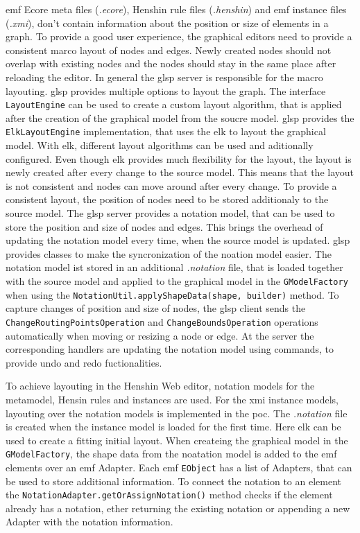 \documentclass[conference,onecolumn]{IEEEtran}
\newcommand{\code}[1]{\texttt{#1}}
\begin{document}
  \ac{emf} Ecore meta files (\textit{.ecore}), Henshin rule files (\textit{.henshin}) and \ac{emf} instance files (\textit{.xmi}), don't contain information about the position or size of elements in a graph. \cite{emf,henshin-repo} To provide a good user experience, the graphical editors need to provide a consistent marco layout of nodes and edges. Newly created nodes should not overlap with existing nodes and the nodes should stay in the same place after reloading the editor. In general the \ac{glsp} server is responsible for the macro layouting. \cite{glsp-doc} \ac{glsp} provides multiple options to layout the graph. The interface \code{LayoutEngine} can be used to create a custom layout algorithm, that is applied after the creation of the graphical model from the soucre model. \ac{glsp} provides the \code{ElkLayoutEngine} implementation, that uses the \ac{elk} to layout the graphical model. \cite{elk-engine} With \ac{elk}, different layout algorithms can be used and aditionally configured. Even though \ac{elk} provides much flexibility for the layout, the layout is newly created after every change to the source model. This means that the layout is not consistent and nodes can move around after every change. To provide a consistent layout, the position of nodes need to be stored additionaly to the source model. The \ac{glsp} server provides a notation model, that can be used to store the position and size of nodes and edges. \cite{glsp-repo} This brings the overhead of updating the notation model every time, when the source model is updated. \ac{glsp} provides classes to make the syncronization of the noation model easier. The notation model ist stored in an additional \textit{.notation} file, that is loaded together with the source model and applied to the graphical model in the \code{GModelFactory} when using the \code{NotationUtil.applyShapeData(shape, builder)} method. To capture changes of position and size of nodes, the \ac{glsp} client sends the \code{ChangeRoutingPointsOperation} and \code{ChangeBoundsOperation} operations automatically when moving or resizing a node or edge. At the server the corresponding handlers are updating the notation model using commands, to provide undo and redo fuctionalities.

  To achieve layouting in the Henshin Web editor, notation models for the metamodel, Hensin rules and instances are used. For the \ac{xmi} instance models, layouting over the notation models is implemented in the \acs{poc}. The \textit{.notation} file is created when the instance model is loaded for the first time. Here \ac{elk} can be used to create a fitting initial layout. When createing the graphical model in the \code{GModelFactory}, the shape data from the noatation model is added to the \ac{emf} elements over an \ac{emf} Adapter. Each \ac{emf} \code{EObject} has a list of Adapters, that can be used to store additional information. \cite{emf} To connect the notation to an element the \code{NotationAdapter.getOrAssignNotation()} method checks if the element already has a notation, ether returning the existing notation or appending a new Adapter with the notation information.
\end{document}
